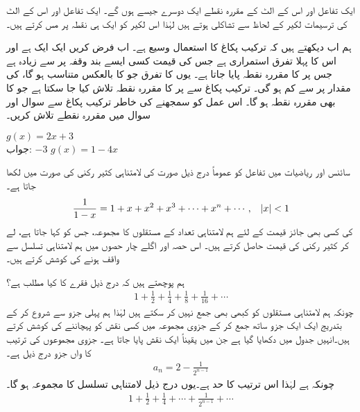 ایک تفاعل اور اس کے الٹ کے مقررہ نقطے ایک دوسرے جیسے ہوں گے۔ ایک تفاعل اور اس کے الٹ کی ترسیمات لکیر  کے لحاظ سے تشاکلی ہوتے ہیں لہٰذا اس لکیر کو ایک ہی نقطہ پر مس کرتے ہیں۔

ہم اب دیکھتے ہیں کہ ترکیب پکاغ کا استعمال وسیع ہے۔ اب فرض کریں  ایک ایک ہے اور اس کا پہلا تفرق استمراری ہے جس کی قیمت کسی ایسے بند وقفہ  پر  سے زیادہ ہے جس پر  کا مقررہ نقطہ پایا جاتا ہے۔ یوں  کا تفرق جو  کا بالعکس متناسب ہو گا، کی مقدار  پر  سے کم ہو گی۔ ترکیب پکاغ سے  پر  کا مقررہ نقطہ تلاش کیا جا سکتا ہے جو  کا بھی مقررہ نقطہ ہو گا۔ اس عمل کو سمجھنے کی خاطر ترکیب پکاغ سے سوال  اور سوال  میں مقررہ نقطے تلاش کریں۔

$g(x)=2x+3$\\
جواب:\quad
$-3$
$g(x)=1-4x$

سائنس اور ریاضیات میں تفاعل کو عموماً درج ذیل صورت کی لامتناہی کثیر رکنی کی صورت میں لکھا جاتا ہے۔
\begin{align*}
\frac{1}{1-x}=1+x+x^2+x^3+\cdots+x^n+\cdots,\quad \abs{x}<1
\end{align*}
 کی کسی بھی جائز قیمت کے لئے ہم  لامتناہی تعداد کے مستقلوں کا مجموعہ، جس کو  کہا جاتا ہے، لے کر کثیر رکنی کی قیمت حاصل کرتے ہیں۔  اس حصہ اور اگلے چار حصوں میں ہم لامتناہی تسلسل سے واقف ہونے کی کوشش کرتے ہیں۔

ہم پوچھتے ہیں کہ درج ذیل  فقرے کا کیا مطلب ہے؟
\begin{align*}
1+\frac{1}{2}+\frac{1}{4}+\frac{1}{8}+\frac{1}{16}+\cdots
\end{align*} 
چونکہ ہم لامتناہی مستقلوں کو کبھی بھی جمع نہیں کر سکتے ہیں لہٰذا ہم پہلی جزو سے شروع کر کے بتدریج ایک ایک جزو ساتھ جمع کر کے جزوی مجموعہ میں کسی نقش کو پہچاننے کی کوشش کرتے ہیں۔انہیں جدول  میں دکھایا گیا ہے جن میں یقیناً ایک نقش پایا جاتا ہے۔ جزوی مجموعوں کی ترتیب کا  واں جزو درج ذیل ہے۔
\begin{align*}
a_n=2-\frac{1}{2^{n-1}}
\end{align*}
چونکہ  ہے لہٰذا اس ترتیب کا حد  ہے۔یوں درج ذیل لامتناہی تسلسل کا مجموعہ  ہو گا۔
\begin{align*}
1+\frac{1}{2}+\frac{1}{4}+\cdots+\frac{1}{2^{n-1}}+\cdots
\end{align*}

